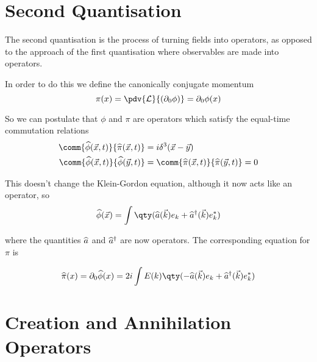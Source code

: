 \section{Second Quantisation}
\label{sec:second-quantisation}

The second quantisation is the process of turning fields into
operators, as opposed to the approach of the first quantisation where
observables are made into operators.

In order to do this we define the canonically conjugate momentum
  \begin{equation} 
\pi(x) = \pdv{\Lag}{(\partial_0 \phi)} = \partial_0 \phi(x)
  \end{equation}
  
So we can postulate that $\phi$ and $\pi$ are operators which satisfy the equal-time commutation relations
\begin{subequations}
\begin{align}
  \comm{\Op{\phi}(\vec{x}, t)}{\Op{\pi} (\vec{x}, t)} &= i \delta^3(\vec{x} - \vec{y}) \\
\comm{\Op{\phi}(\vec{x}, t)}{\Op{\phi}(\vec{y}, t)} &= \comm{\Op{\pi}(\vec{x}, t)}{\Op{\pi}(\vec{y}, t)} = 0
\end{align}
\end{subequations}

This doesn't change the Klein-Gordon equation, although it now acts
like an operator, so
\begin{equation}
  \label{eq:22}
  \Op{\phi}(\vec{x}) = \int \qty(\Op{a}(\vec{k}) e_k + \hcon{\Op{a}}(\vec{k}) e^{*}_{k})
\end{equation}

where the quantities ${\widehat{a}}$ and ${\widehat{a}}^{\dagger}$ are now operators. The corresponding equation for $\pi$ is

\begin{equation}
  \label{eq:23}
  \Op{\pi} (x) = \partial_0 \Op{\phi}(x) = 2i \int E(k) \qty( - \Op{a} (\vec{k}) e_k + \hOp{a}(\vec{k}) e^{*}_k )
\end{equation}

\section{Creation and Annihilation Operators}
\label{sec:creat-annih-oper}

